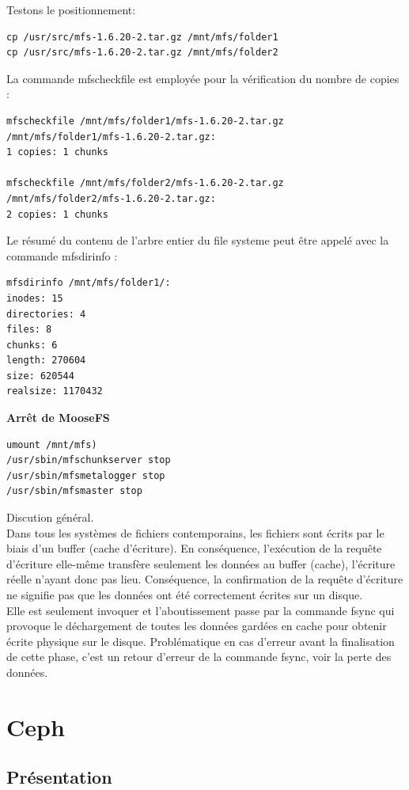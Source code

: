 \documentclass[12pt]{report}
\begin{document}
Testons le positionnement:
\begin{lstlisting}
cp /usr/src/mfs-1.6.20-2.tar.gz /mnt/mfs/folder1
cp /usr/src/mfs-1.6.20-2.tar.gz /mnt/mfs/folder2
	  \end{lstlisting}
\newpage
La commande mfscheckfile est employée pour la vérification du nombre de copies :
\begin{lstlisting}
mfscheckfile /mnt/mfs/folder1/mfs-1.6.20-2.tar.gz
/mnt/mfs/folder1/mfs-1.6.20-2.tar.gz:
1 copies: 1 chunks

mfscheckfile /mnt/mfs/folder2/mfs-1.6.20-2.tar.gz
/mnt/mfs/folder2/mfs-1.6.20-2.tar.gz:
2 copies: 1 chunks
	  \end{lstlisting}
Le résumé du contenu de l'arbre entier du file systeme peut être appelé avec la commande mfsdirinfo :
\begin{lstlisting}
mfsdirinfo /mnt/mfs/folder1/:
inodes: 15
directories: 4
files: 8
chunks: 6
length: 270604
size: 620544
realsize: 1170432
	  \end{lstlisting}
\textbf{Arrêt de MooseFS}\\
\begin{lstlisting}
umount /mnt/mfs)
/usr/sbin/mfschunkserver stop
/usr/sbin/mfsmetalogger stop
/usr/sbin/mfsmaster stop
	  \end{lstlisting}
Discution général.\\
Dans tous les systèmes de fichiers contemporains, les fichiers sont écrits par le biais d'un buffer (cache d'écriture). En conséquence, l'exécution de la requête d'écriture elle-même transfère seulement les données au buffer (cache), l'écriture réelle n'ayant donc pas lieu. Conséquence, la confirmation de la requête d'écriture ne signifie pas que les données ont été correctement écrites sur un disque.\\ Elle est seulement invoquer et l'aboutissement passe par la commande fsync qui provoque le déchargement de toutes les données gardées en cache pour obtenir écrite physique sur le disque. Problématique en cas d'erreur avant la finalisation de cette phase, c'est un retour d'erreur de la commande fsync, voir la perte des données. 

	\chapter{Ceph}
		\section{Présentation}
\end{document}
